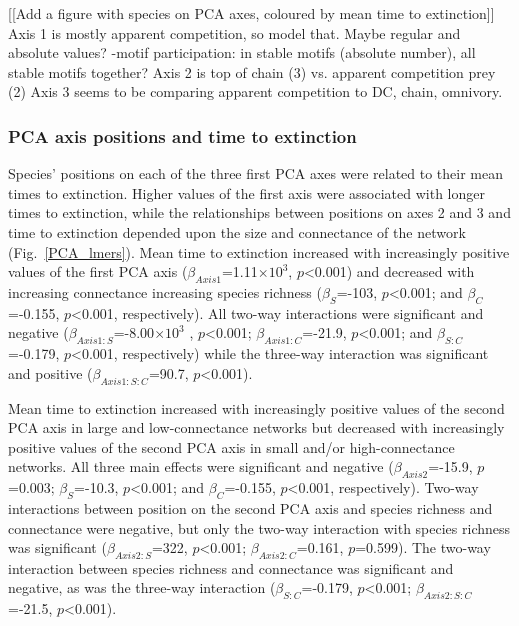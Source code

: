 \documentclass[12pt]{article}
\begin{document}
		[[Add a figure with species on PCA axes, coloured by mean time to extinction]]
		Axis 1 is mostly apparent competition, so model that. Maybe regular and absolute values? 
		-motif participation: in stable motifs (absolute number), all stable motifs together?
		Axis 2 is top of chain (3) vs. apparent competition prey (2)
		Axis 3 seems to be comparing apparent competition to DC, chain, omnivory.
		

		\subsubsection*{PCA axis positions and time to extinction}

			Species' positions on each of the three first PCA axes were related to their mean times to extinction. Higher values of the first axis were associated with longer times to extinction, while the relationships between positions on axes 2 and 3 and time to extinction depended upon the size and connectance of the network (Fig.~\ref{PCA_lmers}). Mean time to extinction increased with increasingly positive values of the first PCA axis ($\beta_{Axis1}$=1.11$\times10^3$, $p$\textless0.001) and decreased with increasing connectance increasing species richness ($\beta_{S}$=-103, $p$\textless0.001; and $\beta_{C}$=-0.155, $p$\textless0.001, respectively). All two-way interactions were significant and negative ($\beta_{Axis1:S}$=-8.00$\times10^3$ , $p$\textless0.001; $\beta_{Axis1:C}$=-21.9, $p$\textless0.001; and $\beta_{S:C}$=-0.179, $p$\textless0.001, respectively) while the three-way interaction was significant and positive ($\beta_{Axis1:S:C}$=90.7, $p$\textless0.001). 


			Mean time to extinction increased with increasingly positive values of the second PCA axis in large and low-connectance networks but decreased with increasingly positive values of the second PCA axis in small and/or high-connectance networks. All three main effects were significant and negative ($\beta_{Axis2}$=-15.9, $p$=0.003; $\beta_{S}$=-10.3, $p$\textless0.001; and $\beta_{C}$=-0.155, $p$\textless0.001, respectively). Two-way interactions between position on the second PCA axis and species richness and connectance were negative, but only the two-way interaction with species richness was significant ($\beta_{Axis2:S}$=322, $p$\textless0.001; $\beta_{Axis2:C}$=0.161, $p$=0.599). The two-way interaction between species richness and connectance was significant and negative, as was the three-way interaction ($\beta_{S:C}$=-0.179, $p$\textless0.001; $\beta_{Axis2:S:C}$=-21.5, $p$\textless0.001).
\end{document}
